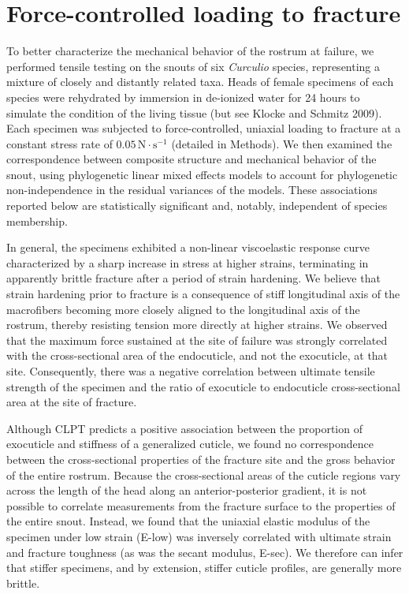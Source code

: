 \documentclass[twocolumn, linenumbers, superscriptaddress, nofootinbib]{revtex4-1}
\begin{document}
	\section{Force-controlled loading to fracture}
		To better characterize the mechanical behavior of the rostrum at failure, we performed tensile testing on the snouts of six \textit{Curculio} species, representing a mixture of closely and distantly related taxa.
		Heads of female specimens of each species were rehydrated by immersion in de-ionized water for 24 hours to simulate the condition of the living tissue (but see Klocke and Schmitz 2009).
		Each specimen was subjected to force-controlled, uniaxial loading to fracture at a constant stress rate of $0.05\,\text{N}\cdot\text{s}^{-1}$ (detailed in Methods).
		We then examined the correspondence between composite structure and mechanical behavior of the snout, using phylogenetic linear mixed effects models to account for phylogenetic non-independence in the residual variances of the models.
		These associations reported below are statistically significant and, notably, independent of species membership.

		In general, the specimens exhibited a non-linear viscoelastic response curve characterized by a sharp increase in stress at higher strains, terminating in apparently brittle fracture after a period of strain hardening.
		We believe that strain hardening prior to fracture is a consequence of stiff longitudinal axis of the macrofibers becoming more closely aligned to the longitudinal axis of the rostrum, thereby resisting tension more directly at higher strains.
		We observed that the maximum force sustained at the site of failure was strongly correlated with the cross-sectional area of the endocuticle, and not the exocuticle, at that site.
		Consequently, there was a negative correlation between ultimate tensile strength of the specimen and the ratio of exocuticle to endocuticle cross-sectional area at the site of fracture.
		
		Although CLPT predicts a positive association between the proportion of exocuticle and stiffness of a generalized cuticle, we found no correspondence between the cross-sectional properties of the fracture site and the gross behavior of the entire rostrum.
		Because the cross-sectional areas of the cuticle regions vary across the length of the head along an anterior-posterior gradient, it is not possible to correlate measurements from the fracture surface to the properties of the entire snout.
		Instead, we found that the uniaxial elastic modulus of the specimen under low strain (E-low) was inversely correlated with ultimate strain and fracture toughness (as was the secant modulus, E-sec).
		We therefore can infer that stiffer specimens, and by extension, stiffer cuticle profiles, are generally more brittle.
		
\end{document}
